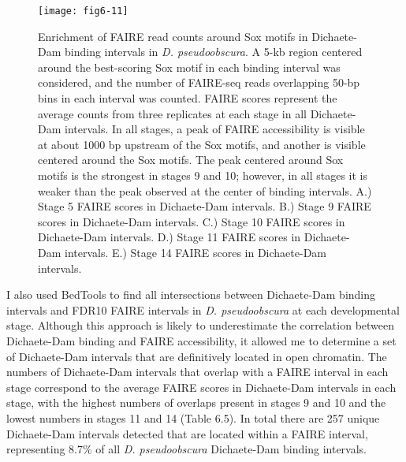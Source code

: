 \begin{figure}
\centering
\texttt{[image: fig6-11]}
\caption[Enrichment of FAIRE read counts around Sox motifs in Dichaete-Dam binding intervals in \emph{D. pseudoobscura}]{Enrichment of FAIRE read counts around Sox motifs in Dichaete-Dam binding intervals in \emph{D. pseudoobscura}. A 5-kb region centered around the best-scoring Sox motif in each binding interval was considered, and the number of FAIRE-seq reads overlapping 50-bp bins in each interval was counted. FAIRE scores represent the average counts from three replicates at each stage in all Dichaete-Dam intervals. In all stages, a peak of FAIRE accessibility is visible at about 1000 bp upstream of the Sox motifs, and another is visible centered around the Sox motifs. The peak centered around Sox motifs is the strongest in stages 9 and 10; however, in all stages it is weaker than the peak observed at the center of binding intervals. A.) Stage 5 FAIRE scores in Dichaete-Dam intervals. B.) Stage 9 FAIRE scores in Dichaete-Dam intervals. C.) Stage 10 FAIRE scores in Dichaete-Dam intervals. D.) Stage 11 FAIRE scores in Dichaete-Dam intervals. E.) Stage 14 FAIRE scores in Dichaete-Dam intervals.}
\label{Figure 6.11}
\end{figure}

I also used BedTools to find all intersections between Dichaete-Dam binding intervals and FDR10 FAIRE intervals in \emph{D. pseudoobscura} at each developmental stage. Although this approach is likely to underestimate the correlation between Dichaete-Dam binding and FAIRE accessibility, it allowed me to determine a set of Dichaete-Dam intervals that are definitively located in open chromatin. The numbers of Dichaete-Dam intervals that overlap with a FAIRE interval in each stage correspond to the average FAIRE scores in Dichaete-Dam intervals in each stage, with the highest numbers of overlaps present in stages 9 and 10 and the lowest numbers in stages 11 and 14 (Table 6.5). In total there are 257 unique Dichaete-Dam intervals detected that are located within a FAIRE interval, representing 8.7\% of all \emph{D. pseudoobscura} Dichaete-Dam binding intervals.\\

